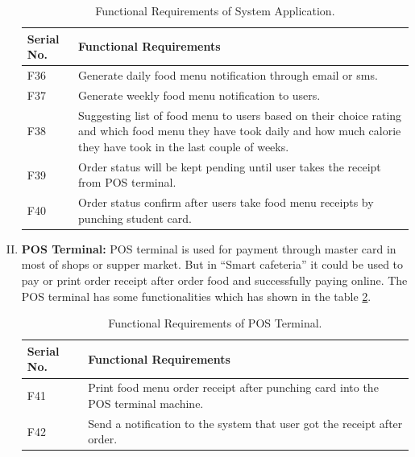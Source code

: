 \begin{enumerate}[(I)]
\begin{table}[h!t]
\centering
 \begin{tabular}{| p{2cm} | p{10cm} |}
    \hline
    Serial No. & Functional Requirements \\ \hline
    F36 & Generate daily food menu notification through email or sms. \\ \hline
    F37 & Generate weekly food menu notification to users. \\ \hline
    F38 & Suggesting list of food menu to users based on their choice rating and
which food menu they have took daily and how much calorie they have took in the last
couple of weeks. \\ \hline
    F39 &  Order status will be kept pending until user takes the receipt from POS
terminal. \\ \hline 
  	F40 & Order status confirm after users take food menu receipts by punching
student card. \\ \hline 
    \end{tabular}
 \caption{Functional Requirements of System Application.}
\label{tab:FRSystemApplication}
\end{table}

\item \textbf{POS Terminal:} POS terminal is used for payment through master
card in most of shops or supper market. But in ``Smart cafeteria'' it could be
used to pay or print order receipt after order food and successfully paying
online. The POS terminal has some functionalities which has shown in the table
\ref{tab:FRPOSTerminal}.

\begin{table}[h!t]
\centering
 \begin{tabular}{| p{2cm} | p{10cm} |}
    \hline
    Serial No. & Functional Requirements \\ \hline
    F41 & Print food menu order receipt after punching card into the POS terminal machine. \\ \hline
    F42 & Send a notification to the system that user got the receipt after order. \\ \hline
       \end{tabular}
 \caption{Functional Requirements of POS Terminal.}
\label{tab:FRPOSTerminal}
\end{table}
\end{enumerate}

